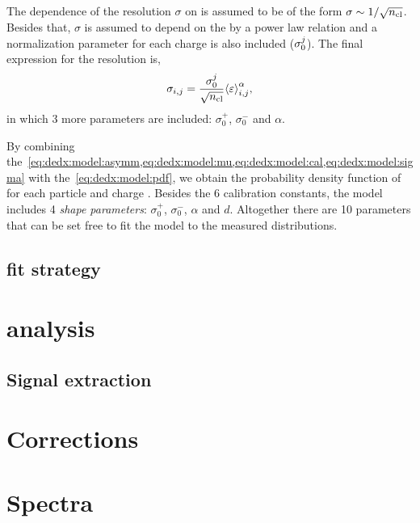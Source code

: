 The dependence of the resolution $\sigma$ on \ncl is assumed to be of the form
$\sigma \sim 1/\sqrt{\mbox{$n_{\text{cl}}$}}$. Besides that, $\sigma$ is assumed to depend
on the \meaneps by a power law relation and a normalization parameter for
each charge is also included ($\sigma_0^{j}$). The final expression for the resolution is,
\begin{equation}
  \sigma_{i,j} = \frac{\sigma_0^{j}}{\sqrt{\mbox{$n_{\text{cl}}$}}} \mbox{$\langle\varepsilon\rangle$}_{i,j}^{\alpha},
  \label{eq:dedx:model:sigma}
\end{equation}
in which 3 more parameters are included: $\sigma_0^+$, $\sigma_0^-$ and $\alpha$. 

By combining
the~\cref{eq:dedx:model:asymm,eq:dedx:model:mu,eq:dedx:model:cal,eq:dedx:model:sigma}
with the~\cref{eq:dedx:model:pdf}, we obtain the probability density
function of \eps for each particle \ipart and charge \ich. Besides the 6 calibration constants,
the model includes 4 \textit{shape parameters}: $\sigma_0^+$, $\sigma_0^-$, $\alpha$ and $d$.
Altogether there are 10 parameters that can be set free to fit the model
to the measured \eps distributions.


\subsection{\dedx fit strategy}



\section{\vzero analysis}


\subsection{Signal extraction}




\section{Corrections}


\section{Spectra}


